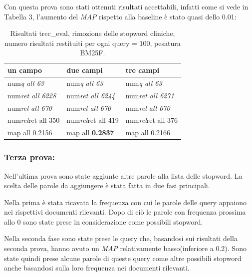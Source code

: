 \documentclass[runningheads]{llncs}
\begin{document}
Con questa prova sono stati ottenuti risultati accettabili, infatti come si vede in Tabella 3, l'aumento del \textit{MAP} rispetto alla baseline \`e stato quasi dello 0.01:
\begin{table}
\vspace{-3mm}
\centering
\begin{tabular}{lll}
\hline
\textbf{ un campo }           & \textbf{ due campi }           & \textbf{ tre campi }            \\ \hline
 num\textit{q all 63 }       &  num\textit{q all 63 }       &  num\textit{q all 63 }        \\
 num\textit{ret all 6228 }  &  num\textit{ret all 6244 }  &  num\textit{ret all 6271 }   \\
 num\textit{rel all 670 }    &  num\textit{rel all 670 }    &  num\textit{rel all 670 }     \\
 num\textit{rel}ret all 350  &  num\textit{rel}ret all 419  &  num\textit{rel}ret all 376   \\
map all 0.2156               & map all \bf 0.2837               & map all 0.2166          \\ \hline
\end{tabular}

\caption{ Risultati trec\_eval, rimozione delle stopword cliniche, numero risultati restituiti per ogni query = 100, pesatura BM25F.}
\vspace{-7mm}
\end{table}


\subsubsection{Terza prova:}

Nell'ultima prova sono state aggiunte altre parole alla lista delle stopword. La scelta delle parole da aggiungere \`e stata fatta in due fasi principali.

Nella prima \`e stata ricavata la frequenza con cui le parole delle query appaiono nei rispettivi documenti rilevanti. Dopo di ci\`o le parole con frequenza prossima allo 0 sono state prese in considerazione come possibili stopword.

Nella seconda fase sono state prese le query che, basandosi sui risultati della seconda prova, hanno avuto un \textit{MAP} relativamente basso(inferiore a 0.2). Sono state quindi prese alcune parole di queste query come altre possibili stopword anche basandosi sulla loro frequenza nei documenti rilevanti.
\end{document}
